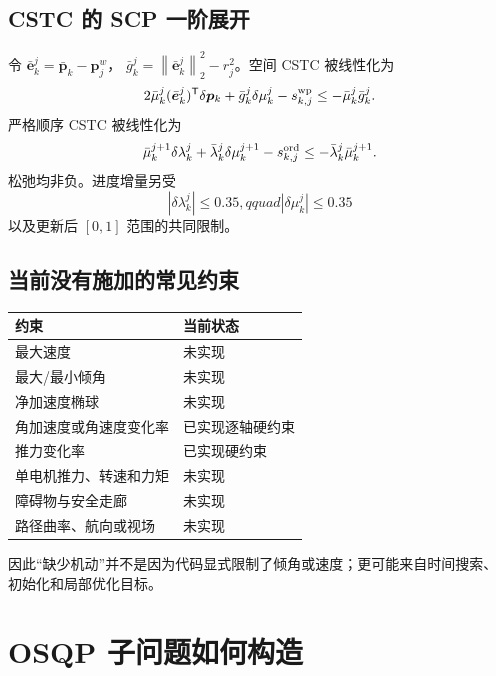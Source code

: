 \documentclass[UTF8,a4paper,11pt]{ctexart}
\newcommand{\normtwo}[1]{\left\lVert#1\right\rVert_2}
\begin{document}
\subsection{CSTC 的 SCP 一阶展开}

令 $\bar{\bm e}_k^j=\bar{\bm p}_k-\bm p_j^w$，
$\bar g_k^j=\normtwo{\bar{\bm e}_k^j}^2-r_j^2$。空间 CSTC 被线性化为
\begin{equation}
 2\bar\mu_k^j(\bar{\bm e}_k^j)^\mathsf T\delta\bm p_k
 +\bar g_k^j\delta\mu_k^j-s_{k,j}^{\rm wp}
 \leq-\bar\mu_k^j\bar g_k^j.
 \label{eq:linear-space}
\end{equation}
严格顺序 CSTC 被线性化为
\begin{equation}
 \bar\mu_k^{j+1}\delta\lambda_k^j
 +\bar\lambda_k^j\delta\mu_k^{j+1}-s_{k,j}^{\rm ord}
 \leq-\bar\lambda_k^j\bar\mu_k^{j+1}.
 \label{eq:linear-order}
\end{equation}
松弛均非负。进度增量另受
\begin{equation}
 |\delta\lambda_k^j|\leq0.35,qquad
 |\delta\mu_k^j|\leq0.35
\end{equation}
以及更新后 $[0,1]$ 范围的共同限制。

\subsection{当前没有施加的常见约束}

\begin{center}
\begin{tabularx}{\linewidth}{lX}
\toprule
约束 & 当前状态\\
\midrule
最大速度 & 未实现\\
最大/最小倾角 & 未实现\\
净加速度椭球 & 未实现\\
角加速度或角速度变化率 & 已实现逐轴硬约束\\
推力变化率 & 已实现硬约束\\
单电机推力、转速和力矩 & 未实现\\
障碍物与安全走廊 & 未实现\\
路径曲率、航向或视场 & 未实现\\
\bottomrule
\end{tabularx}
\end{center}
因此“缺少机动”并不是因为代码显式限制了倾角或速度；更可能来自时间搜索、
初始化和局部优化目标。

\section{OSQP 子问题如何构造}
\end{document}

